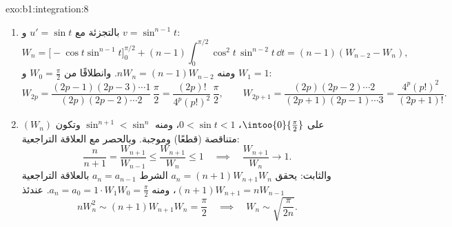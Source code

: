 \begin{solution}{exo:b1:integration:8}
\begin{enumerate}
  \item بالتجزئة مع $u' = \sin t$ و $v = \sin^{n-1} t$:
        \[
        W_n = \bigl[-\cos t\sin^{n-1}t\bigr]_0^{\pi/2}
        + (n-1)\int_0^{\pi/2} \cos^2 t\,\sin^{n-2} t\,\dd t
        = (n-1)(W_{n-2} - W_n),
        \]
        ومنه $nW_n = (n-1)W_{n-2}$. وانطلاقًا من $W_0 = \frac\pi2$ و $W_1 = 1$:
        \[
        W_{2p} = \frac{(2p-1)(2p-3)\cdots 1}{(2p)(2p-2)\cdots 2}\,
        \frac{\pi}{2} = \frac{(2p)!}{4^p (p!)^2}\,\frac\pi2,
        \qquad
        W_{2p+1} = \frac{(2p)(2p-2)\cdots 2}{(2p+1)(2p-1)\cdots 3}
        = \frac{4^p (p!)^2}{(2p+1)!} .
        \]
  \item على $\intoo{0}{\frac\pi2}$، $0 < \sin t < 1$، ومنه $\sin^{n+1} <
        \sin^n$ وتكون $(W_n)$ متناقصة (قطعًا) وموجبة.
        وبالحصر مع العلاقة التراجعية:
        \[
        \frac{n}{n+1} = \frac{W_{n+1}}{W_{n-1}}
        \leq \frac{W_{n+1}}{W_n} \leq 1
        \quad\implies\quad \frac{W_{n+1}}{W_n} \to 1 .
        \]
        والثابت: يحقق $a_n = (n+1)W_{n+1}W_n$ الشرط $a_n = a_{n-1}$
        بالعلاقة التراجعية $(n+1)W_{n+1} = nW_{n-1}$، ومنه $a_n = a_0 =
        1 \cdot W_1 W_0 = \frac\pi2$. عندئذ
        \[
        n W_n^2 \sim (n+1) W_{n+1} W_n = \frac\pi2
        \quad\implies\quad
        W_n \sim \sqrt{\frac{\pi}{2n}} .
        \]
\end{enumerate}
\end{solution}

